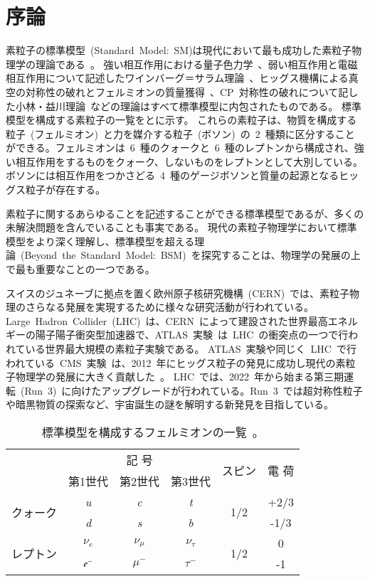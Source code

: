 \chapter{序論}
\thispagestyle{empty}
\label{chap:1}
素粒子の標準模型~(Standard~Model:~SM)は現代において最も成功した素粒子物理学の理論である~\cite{URL:10}。
強い相互作用における量子色力学~\cite{AR:04}、弱い相互作用と電磁相互作用について記述したワインバーグ＝サラム理論~\cite{AR:05,AR:05a}、ヒッグス機構による真空の対称性の破れとフェルミオンの質量獲得~\cite{AR:06}、CP~対称性の破れについて記した小林・益川理論~\cite{AR:07}などの理論はすべて標準模型に内包されたものである。
標準模型を構成する素粒子の一覧をとに示す。
これらの素粒子は、物質を構成する粒子~(フェルミオン)~と力を媒介する粒子~(ボソン)~の~2~種類に区分することができる。フェルミオンは~6~種のクォークと~6~種のレプトンから構成され、強い相互作用をするものをクォーク、しないものをレプトンとして大別している。ボソンには相互作用をつかさどる~4~種のゲージボソンと質量の起源となるヒッグス粒子が存在する。

素粒子に関するあらゆることを記述することができる標準模型であるが、多くの未解決問題を含んでいることも事実である。
現代の素粒子物理学において標準模型をより深く理解し、標準模型を超える理論~(Beyond~the~Standard~Model:~BSM)~を探究することは、物理学の発展の上で最も重要なことの一つである。

スイスのジュネーブに拠点を置く欧州原子核研究機構~(CERN)~\cite{URL:11}では、素粒子物理のさらなる発展を実現するために様々な研究活動が行われている。Large~Hadron~Collider~(LHC)~\cite{URL:12}は、CERN~によって建設された世界最高エネルギーの陽子陽子衝突型加速器で、ATLAS~実験~\cite{URL:13}は~LHC~の衝突点の一つで行われている世界最大規模の素粒子実験である。
ATLAS~実験や同じく~LHC~で行われている~CMS~実験~\cite{URL:14}は、2012~年にヒッグス粒子の発見に成功し現代の素粒子物理学の発展に大きく貢献した~\cite{TR:03,TR:03a}。
LHC~では、2022~年から始まる第三期運転~(Run~3)~に向けたアップグレードが行われている。Run~3~では超対称性粒子や暗黒物質の探索など、宇宙誕生の謎を解明する新発見を目指している。

\begin{table}[htbp]
	\centering
	\begin{tabular}{c|ccc|c|c} \hline
	& \multicolumn{3}{c|}{記 号} & \multirow{2}{*}{スピン} & \multirow{2}{*}{電  荷} \\
	& 第1世代 & 第2世代 & 第3世代 &&  \\ \hline\hline
	\multirow{2}{*}{クォーク} & \it{u} & \it{c} & \it{t} & \multirow{2}{*}{1/2} & +2/3 \\
	& \it{d} & \it{s} & \it{b} &  & -1/3 \\ \hline
	\multirow{2}{*}{レプトン} & $\nu_{e}$ & $\nu_{\mu}$ & $\nu_{\tau}$ & \multirow{2}{*}{1/2} & 0 \\
	& $\it{e}^-$ & $\mu^-$ & $\tau^-$ &  & -1 \\ \hline
	\end{tabular}
	\caption[標準模型を構成するフェルミオンの一覧]{標準模型を構成するフェルミオンの一覧~\cite{URL:10}。}
	\label{tb:SM1}
\end{table}

